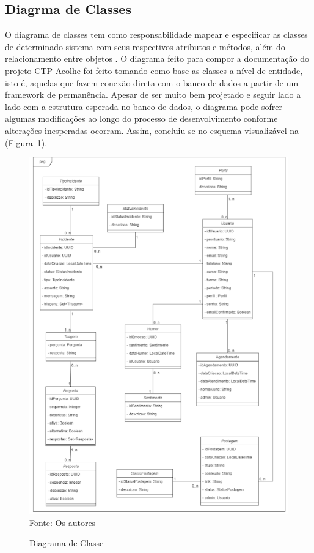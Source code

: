 \documentclass[12pt,a4paper]{article}
\begin{document}
\newpage

\subsection{Diagrma de Classes}
O diagrama de classes tem como responsabilidade mapear e especificar as classes de determinado sistema com seus respectivos atributos e métodos, além do relacionamento entre objetos \cite{sig}. O diagrama feito para compor a documentação do projeto \gls{CTP Acolhe} foi feito tomando como base as classes a nível de entidade, isto é, aquelas que fazem conexão direta com o banco de dados a partir de um framework de permanência. Apesar de ser muito bem projetado e seguir lado a lado com a estrutura esperada no banco de dados, o diagrama pode sofrer algumas modificações ao longo do processo de desenvolvimento conforme alterações inesperadas ocorram. Assim, concluiu-se no esquema visualizável na  (Figura~\ref{dia}).

\newpage

\begin{figure}[H]
    \centering
    \caption{Diagrama de Classe}
     \includegraphics[width=15cm]{diagram.png}
    Fonte: Os autores
    \label{dia}
\end{figure}
\end{document}
